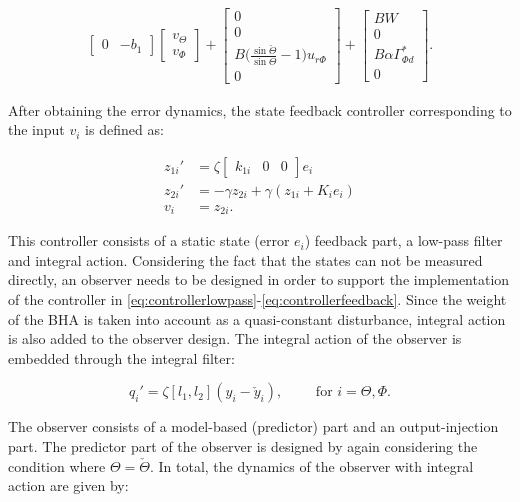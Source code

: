\documentclass[main.tex]{subfiles}
\begin{document}
\begin{align}
\begin{bmatrix}
	 0 & -b_1 
	 \end{bmatrix}
	 \begin{bmatrix}
	 v_\Theta \\
	 v_\Phi
	 \end{bmatrix} + 
	 \begin{bmatrix}
	 0 \\
	 0 \\
	 B\bigg( \frac{\sin \check{\Theta}}{\sin \Theta} - 1 \bigg) u_{r\Phi} \\
	 0
	 \end{bmatrix}
	 \label{eq:errordynamics2}+
	 \begin{bmatrix}
	 BW \\
	 0 \\
	 B\alpha \Gamma_{\Phi d}^* \\
	 0
	 \end{bmatrix}.
	 \end{align}
	
	After obtaining the error dynamics, the state feedback controller corresponding to the input $v_i$ is defined as:
	
	\begin{align}
		z_{1i}' &= \zeta \begin{bmatrix}
		k_{1i} & 0 & 0
		\end{bmatrix}e_i \label{eq:controllerlowpass}\\
		z_{2i}' &= -\gamma z_{2i} + \gamma (z_{1i} + K_i e_i) \label{eq:controllerintegral}\\
		v_i &= z_{2i}\label{eq:controllerfeedback}.
	\end{align}
	
	This controller consists of a static state (error $e_i$) feedback part, a low-pass filter and integral action. Considering the fact that the states can not be measured directly, an observer needs to be designed in order to support the implementation of the controller in \eqref{eq:controllerlowpass}-\eqref{eq:controllerfeedback}. Since the weight of the BHA is taken into account as a quasi-constant disturbance, integral action is also added to the observer design. The integral action of the observer is embedded through the integral filter:
	
	\begin{equation}
		q_i' = \zeta[l_1,l_2](y_i - \check{y}_i), \qquad \text{ for } i=\Theta,\Phi. \label{eq:observerintegral}
	\end{equation}
	
	The observer consists of a model-based (predictor) part and an output-injection part. The predictor part of the observer is designed by again considering the condition where $\Theta = \check{\Theta}$. In total, the dynamics of the observer with integral action are given by:
\end{document}
